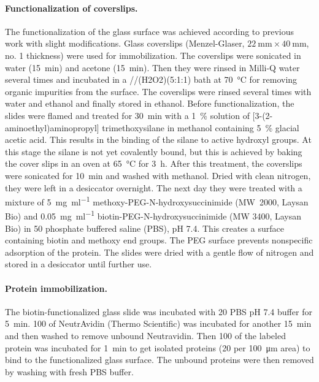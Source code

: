 \paragraph*{Functionalization of coverslips.}
The functionalization of the glass surface was achieved according to previous work with slight modifications.\cite{gupta2012involvement}
Glass coverslips (Menzel-Glaser, $\SI{22}{\mm} \times \SI{40}{\mm}$, no. 1 thickness) were used for immobilization.
The coverslips were sonicated in water (\SI{15}{\minute}) and acetone (\SI{15}{\minute}).
Then they were rinsed in Milli-Q water several times and incubated in a //\ce(H2O2)(5:1:1) bath at \SI{70}{\celsius} for removing organic impurities from the surface.
The coverslips were rinsed several times with water and ethanol and finally stored in ethanol.
Before functionalization, the slides were flamed and treated for \SI{30}{\minute} with a \SI{1}{\percent} solution of [3-(2-aminoethyl)aminopropyl] trimethoxysilane in methanol containing \SI{5}{\percent} glacial acetic acid. This results in the binding of the silane to active hydroxyl groups.
At this stage the silane is not yet covalently bound, but this is achieved by baking the cover slips in an oven at \SI{65}{\celsius} for \SI{3}{\hour}.
After this treatment, the coverslips were sonicated for \SI{10}{\minute} and washed with methanol.
Dried with clean nitrogen, they were left in a desiccator overnight. 
The next day they were treated with a mixture of \SI{5}{\mg\per\ml} methoxy-PEG-N-hydroxysuccinimide (MW~2000, Laysan Bio) and \SI{0.05}{\mg\per\ml} biotin-PEG-N-hydroxysuccinimide (MW 3400, Laysan Bio) in \SI{50}{\mM} phosphate buffered saline (PBS), pH 7.4.
This creates a surface containing biotin and methoxy end groups.
The PEG surface prevents nonspecific adsorption of the protein.
The slides were dried with a gentle flow of nitrogen and stored in a desiccator until further use.


\paragraph*{Protein immobilization.}
The biotin-functionalized glass slide was incubated with \SI{20}{\mM} PBS pH 7.4 buffer for \SI{5}{\minute}.
\SI{100}{\nM} of NeutrAvidin (Thermo Scientific) was incubated for another \SI{15}{\minute} and then washed to remove unbound Neutravidin. 
Then \SI{100}{\pM} of the labeled protein was incubated for \SI{1}{\minute} to get isolated proteins (20 per \SI{100}{\um} area) to bind to the functionalized glass surface.
The unbound proteins were then removed by washing with fresh PBS buffer.


